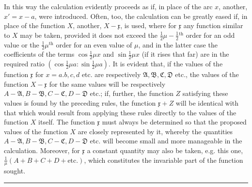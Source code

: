 In this way the calculation evidently proceeds as if, in place of the arc \(x\), another, \(x'=x-a\), were introduced. Often, too, the calculation can be greatly eased if, in place of the function \(X\), another, \(X-\mathfrak{x}\), is used, where for \(\mathfrak{x}\) any function similar to \(X\) may be taken, provided it does not exceed the \(\frac12\mu-\frac12{}^{\mathrm{th}}\) order for an odd value or the \(\frac12\mu^{\mathrm{th}}\) order for an even value of \(\mu\), and in the latter case the coefficients of the terms \(\cos\frac12\mu x\) and \(\sin\frac12\mu x\) (if it rises that far) are in the required ratio \((\cos\frac12\mu a:\sin\frac12\mu a)\). It is evident that, if the values of the function \(\mathfrak{x}\) for \(x=a.b,c,d\) etc. are respectively \(\mathfrak{A},\mathfrak{B},\mathfrak{C},\mathfrak{D}\) etc., the values of the function \(X-\mathfrak{x}\) for the same values will be respectively \(A-\mathfrak{A},B-\mathfrak{B},C-\mathfrak{C},D-\mathfrak{D}\) etc.; if, further, the function \(Z\) satisfying these values is found by the preceding rules, the function \(\mathfrak{x}+Z\) will be identical with that which would result from applying these rules directly to the values of the function \(X\) itself. The function \(\mathfrak{x}\) must always be determined so that the proposed values of the function \(X\) are closely represented by it, whereby the quantities \(A-\mathfrak{A},B-\mathfrak{B},C-\mathfrak{C},D-\mathfrak{D}\) etc. will become small and more manageable in the calculation. Moreover, for \(\mathfrak{x}\) a constant quantity may also be taken, e.g. this one, \(\frac1\mu(A+B+C+D+\text{etc.})\), which constitutes the invariable part of the function sought.

\begin{center}\rule{0.28\linewidth}{0.4pt}\end{center}
\endgroup
